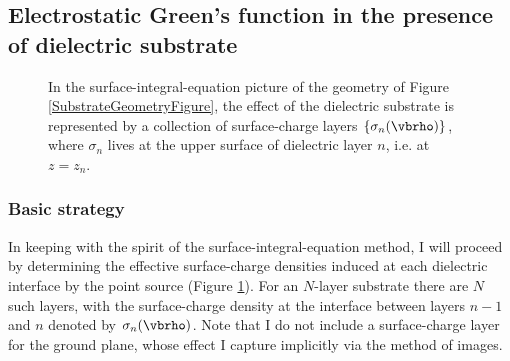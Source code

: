 \documentclass[letterpaper]{article}
\begin{document}
\subsection{Electrostatic Green's function in the presence of
            dielectric substrate}
\begin{figure}
\begin{center}
\caption{In the surface-integral-equation picture of the geometry of Figure
         \ref{SubstrateGeometryFigure}, the effect of the dielectric substrate
         is represented by a collection of surface-charge layers
         $\{\sigma_{n}(\vbrho)\}$, where $\sigma_n$ lives at the 
         upper surface of dielectric layer $n$, i.e. at $z=z_n$.}
\label{SigmaLayersFigure}
\end{center}
\end{figure}

\subsubsection{Basic strategy}

In keeping with the spirit of the surface-integral-equation method, I
will
proceed by determining the effective surface-charge densities
induced at each dielectric interface by the point source
(Figure \ref{SigmaLayersFigure}). For an $N$-layer substrate
there are $N$ such layers, with the surface-charge density at
the interface between layers $n-1$ and $n$ denoted by $\sigma_n(\vbrho)$.
Note that I do not include a
surface-charge layer for the ground plane, whose effect I capture
implicitly via the method of images. 
\end{document}
